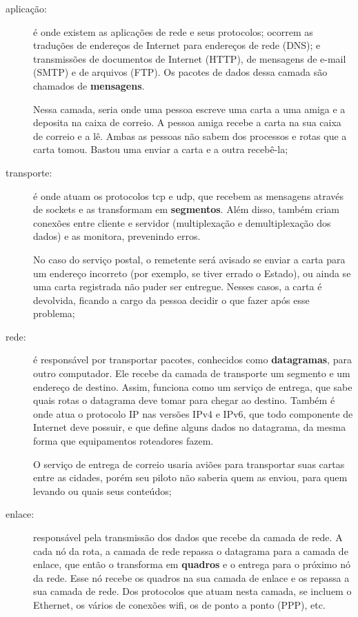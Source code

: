 \begin{description}
    \item[aplicação:] é onde existem as aplicações de rede e seus protocolos; ocorrem
        as traduções de endereços de Internet para endereços de rede (DNS); e
        transmissões de documentos de Internet (HTTP), de mensagens de e-mail (SMTP) e
        de arquivos (FTP). Os pacotes de dados dessa camada são chamados de
        \textbf{mensagens}.

        Nessa camada, seria onde uma pessoa escreve uma carta a uma amiga e a deposita
        na caixa de correio. A pessoa amiga recebe a carta na sua caixa de correio e a
        lê. Ambas as pessoas não sabem dos processos e rotas que a carta tomou. Bastou
        uma enviar a carta e a outra recebê-la;

    \item[transporte:] é onde atuam os protocolos \gls{tcp} e \gls{udp}, que recebem as
        mensagens através de \glspl{socket} e as transformam em \textbf{segmentos}.
        Além disso, também criam conexões entre cliente e servidor (multiplexação e
        demultiplexação dos dados) e as monitora, prevenindo erros.

        No caso do serviço postal, o remetente será avisado se enviar a carta para um
        endereço incorreto (por exemplo, se tiver errado o Estado), ou ainda se uma
        carta registrada não puder ser entregue. Nesses casos, a carta é devolvida,
        ficando a cargo da pessoa decidir o que fazer após esse problema;

    \item[rede:] é responsável por transportar pacotes, conhecidos como
        \textbf{datagramas}, para outro computador. Ele recebe da camada de transporte
        um segmento e um endereço de destino. Assim, funciona como um serviço de
        entrega, que sabe quais rotas o datagrama deve tomar para chegar ao destino.
        Também é onde atua o protocolo IP nas versões IPv4 e IPv6, que todo componente
        de Internet deve possuir, e que define alguns dados no datagrama, da mesma
        forma que equipamentos roteadores fazem.

        O serviço de entrega de correio usaria aviões para transportar suas cartas
        entre as cidades, porém seu piloto não saberia quem as enviou, para quem
        levando ou quais seus conteúdos;

    \item[enlace:] responsável pela transmissão dos dados que recebe da camada de rede.
        A cada nó da rota, a camada de rede repassa o datagrama para a camada de
        enlace, que então o transforma em \textbf{quadros} e o entrega para o próximo
        nó da rede. Esse nó recebe os quadros na sua camada de enlace e os repassa a
        sua camada de rede. Dos protocolos que atuam nesta camada, se incluem o
        Ethernet, os vários de conexões wifi, os de ponto a ponto (PPP), etc.


\end{description}
